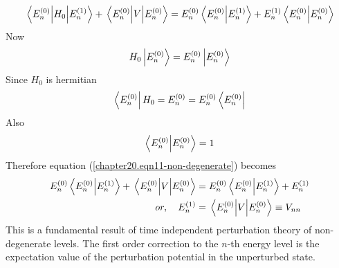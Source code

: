 \begin{equation}
\matrixel{E_n^{(0)}}{H_0}{E_n^{(1)}}
 + \matrixel{E_n^{(0)}}{V}{E_{n}^{(0)}} = E_n^{(0)} \braket{E_n^{(0)}}{E_n^{(1)}} + E_n^{(1)} \braket{E_n^{(0)}}{E_n^{(0)}}
\label{chapter20.eqn11-non-degenerate}
\end{equation}
Now 
\begin{equation}
H_0 \ket{E_{n}^{(0)}} = E_n^{(0)} \ket{E_{n}^{(0)}}
\end{equation}
Since $H_0$ is hermitian
\begin{equation}
	\bra{E_n^{(0)}} H_0 = E_n^{(0)} = E_n^{(0)} \bra{E_n^{(0)}}
\end{equation}
Also
\begin{equation}
\braket{E_n^{(0)}}{E_n^{(0)}} = 1
\end{equation}
Therefore equation (\ref{chapter20.eqn11-non-degenerate}) becomes
\begin{align}
E_n^{(0)} \braket{E_n^{(0)}}{E_n^{(1)}} + \matrixel{E_n^{(0)}}{ V}{E_{n}^{(0)}} 
&= E_n^{(0)} \braket{E_n^{(0)}}{E_n^{(1)}} + E_n^{(1)} \nonumber \\
or, \quad E_n^{(1)} &= \matrixel{E_n^{(0)}}{V}{E_{n}^{(0)}} \equiv V_{n n}
\end{align}
This is a fundamental result of time independent perturbation theory of non-degenerate levels. The first order correction to the $n$-th energy level is the expectation value of the perturbation potential in the unperturbed state.



